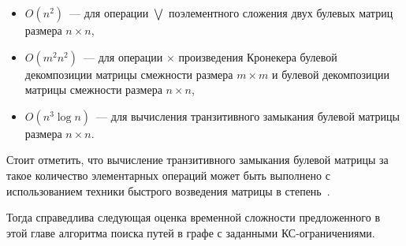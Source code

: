 \begin{itemize}
    \item $O(n^2)$~--- для операции $\bigvee$ поэлементного сложения двух булевых матриц размера $n \times n$,
    \item $O(m^2n^2)$~--- для операции $\times$ произведения Кронекера булевой декомпозиции матрицы смежности размера $m \times m$ и булевой декомпозиции матрицы смежности размера $n \times n$,
    \item $O(n^3\log n)$~--- для вычисления транзитивного замыкания булевой матрицы размера $n \times n$.
\end{itemize}

Стоит отметить, что вычисление транзитивного замыкания булевой матрицы за такое количество элементарных операций может быть выполнено с использованием техники быстрого возведения матрицы в степень~\cite{baras2010path}.

Тогда справедлива следующая оценка временной сложности предложенного в этой главе алгоритма поиска путей в графе с заданными КС-ограничениями.


